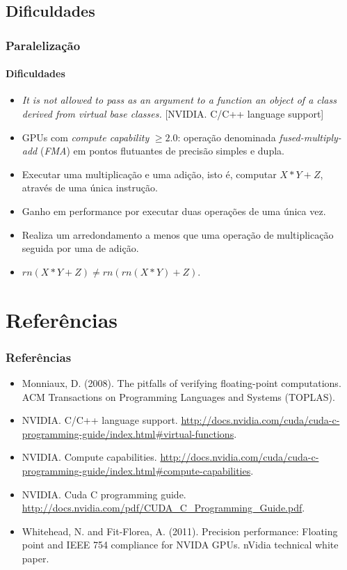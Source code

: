 \documentclass[10pt]{beamer}
\begin{document}
\subsection{Dificuldades}
\begin{frame}
\frametitle{Paralelização}
\framesubtitle{Dificuldades}


\begin{itemize}
  \item \textit{It is not allowed to pass as an argument to a 
  function an object of a class derived from virtual base classes.} [NVIDIA.
  C/C++ language support]

  \item GPUs com \textit{compute capability} \(\ge2.0\): operação denominada
  \textit{fused-multiply-add} (\textit{FMA}) em pontos flutuantes de precisão
  simples e dupla.
  \item  Executar uma multiplicação e uma adição, isto é, computar \(X * Y +
  Z\), através de uma única instrução.
  \item Ganho em performance por executar duas operações de uma única vez.
  \item Realiza um arredondamento a menos que uma operação de multiplicação
  seguida por uma de adição.
  \item \(rn(X*Y+Z) \ne  rn(rn(X*Y) + Z)\). 
\end{itemize}

\end{frame}

\section{Referências}
\begin{frame}
\frametitle{Referências}

\begin{itemize}
\item Monniaux, D. (2008). The pitfalls of verifying floating-point computations. ACM Transactions on Programming Languages and Systems (TOPLAS).
\item NVIDIA. C/C++ language support. \url{http://docs.nvidia.com/cuda/cuda-c-programming-guide/index.html#virtual-functions}.
\item NVIDIA. Compute capabilities. \url{http://docs.nvidia.com/cuda/cuda-c-programming-guide/index.html#compute-capabilities}.
\item NVIDIA. Cuda C programming guide. \url{http://docs.nvidia.com/pdf/CUDA_C_Programming_Guide.pdf}.
\item Whitehead, N. and Fit-Florea, A. (2011). Precision performance: Floating point and IEEE 754 compliance for NVIDA GPUs. nVidia technical white paper.
\end{itemize}

\end{frame}
\end{document}
